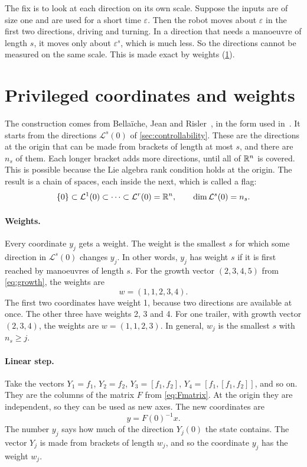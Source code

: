 The fix is to look at each direction on its own scale. Suppose the inputs are
of size one and are used for a short time $\varepsilon$. Then the robot moves
about $\varepsilon$ in the first two directions, driving and turning. In a
direction that needs a manoeuvre of length $s$, it moves only about
$\varepsilon^{s}$, which is much less. So the directions cannot be measured on
the same scale. This is made exact by weights (\cref{sec:privileged}).

\section{Privileged coordinates and weights}
\label{sec:privileged}

The construction comes from Bella\"iche, Jean and Risler~\cite{bellaiche2005},
in the form used in~\cite{zuyev2024}. It starts from the directions
$\mathcal L^s(0)$ of \cref{sec:controllability}. These are the directions at the
origin that can be made from brackets of length at most $s$, and there are $n_s$
of them. Each longer bracket adds more directions, until all of $\mathbb{R}^n$ is
covered. This is possible because the Lie algebra rank condition holds at the
origin. The result is a chain of spaces, each inside the next, which is called a
flag:
\begin{equation}
  \{0\}\subset\mathcal L^1(0)\subset\dots\subset\mathcal L^r(0)=\mathbb{R}^n ,
  \qquad \dim\mathcal L^s(0)=n_s .
\end{equation}

\paragraph{Weights.}
Every coordinate $y_j$ gets a weight. The weight is the smallest $s$ for which
some direction in $\mathcal L^s(0)$ changes $y_j$. In other words, $y_j$ has
weight $s$ if it is first reached by manoeuvres of length $s$. For the growth
vector $(2,3,4,5)$ from \eqref{eq:growth}, the weights are
\begin{equation}
  w=(1,1,2,3,4).
  \label{eq:weights}
\end{equation}
The first two coordinates have weight 1, because two directions are available at
once. The other three have weights 2, 3 and 4. For one trailer, with growth
vector $(2,3,4)$, the weights are $w=(1,1,2,3)$. In general, $w_j$ is the
smallest $s$ with $n_s\ge j$.

\paragraph{Linear step.}
Take the vectors $Y_1=f_1$, $Y_2=f_2$, $Y_3=[f_1,f_2]$, $Y_4=[f_1,[f_1,f_2]]$,
and so on. They are the columns of the matrix $F$ from \eqref{eq:Fmatrix}. At the
origin they are independent, so they can be used as new axes. The new
coordinates are
\begin{equation}
  y=F(0)^{-1}x .
  \label{eq:ylinear}
\end{equation}
The number $y_j$ says how much of the direction $Y_j(0)$ the state contains. The
vector $Y_j$ is made from brackets of length $w_j$, and so the coordinate $y_j$
has the weight $w_j$.

